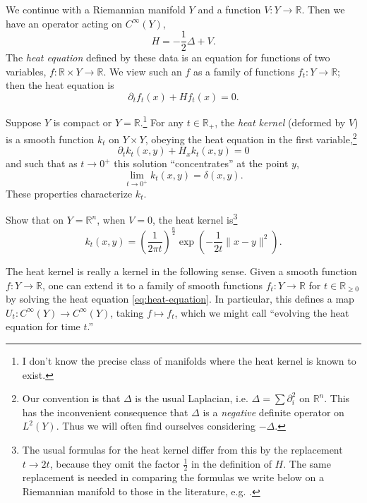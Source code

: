 \documentclass[12pt,letterpaper,reqno]{article}
\numberwithin{equation}{section}
\newcommand{\R}{\ensuremath{\mathbb R}}
\newcommand{\half}{\ensuremath{\frac{1}{2}}}
\newcommand{\norm}[1]{\lVert#1\rVert}
\newcommand{\ti}[1]{\textit{#1}}
\begin{document}
We continue with a Riemannian manifold $Y$ and a function $V: Y \to \R$.
Then we have an operator acting on $C^\infty(Y)$,
\begin{equation}
  H = - \half \Delta + V.
\end{equation}
The \ti{heat equation} defined by these data is an equation
for functions of two variables, $f: \R \times Y \to \R$.
We view such an $f$ as a family of functions $f_t: Y \to \R$;
then the heat equation is
\begin{equation} \label{eq:heat-equation}
  \partial_t f_t(x) + H f_t(x) = 0. 
\end{equation}

\begin{prop} Suppose $Y$ is compact or $Y = \R$.\footnote{I don't know the
precise class of manifolds where the heat kernel is known to exist.}
For any $t \in \R_+$, the \ti{heat kernel} (deformed by $V$) 
is a smooth function $k_t$ on $Y \times Y$, obeying the heat
equation in the first variable,\footnote{Our
convention is that $\Delta$ is the usual Laplacian,
i.e. $\Delta = \sum \partial_i^2$ on $\R^n$. This has the inconvenient
consequence that $\Delta$ is a \ti{negative} definite operator on $L^2(Y)$.
Thus we will often find ourselves considering $- \Delta$.}
\begin{equation}
  \partial_t k_t(x,y) + H_x k_t(x,y) = 0
\end{equation}
and such that as $t \to 0^+$ this solution ``concentrates'' at the point $y$,
\begin{equation}
  \lim_{t \to 0^+} k_t(x,y) = \delta(x,y). 
\end{equation}
These properties characterize $k_t$.
\end{prop}
\begin{exercise}
Show that on $Y = \R^n$, when $V = 0$, the heat kernel
is\footnote{The usual formulas for the heat kernel differ from this by the
replacement $t \to 2t$, because they omit the factor $\half$ in the
definition of $H$. The same replacement is needed in comparing the formulas we write below
on a Riemannian manifold to those in the literature, e.g. \cite{Roe1988a}.}
\begin{equation}\label{eq:heat-kernel}
  k_t(x,y) = \left( \frac{1}{2 \pi t} \right)^{\frac{n}{2}} \exp \left( - \frac{1}{2t} \norm{x-y}^2 \right).
\end{equation}
\end{exercise}

The heat kernel is really a kernel in the following sense.
Given a smooth function $f: Y \to \R$, one can extend it to a family of smooth 
functions $f_t: Y \to \R$ for $t \in \R_{\ge 0}$ by solving the heat equation
\eqref{eq:heat-equation}.
In particular, this defines a map $U_t: C^\infty(Y) \to C^\infty(Y)$,
taking $f \mapsto f_t$, which we might call
``evolving the heat equation for time $t$.''
\end{document}
